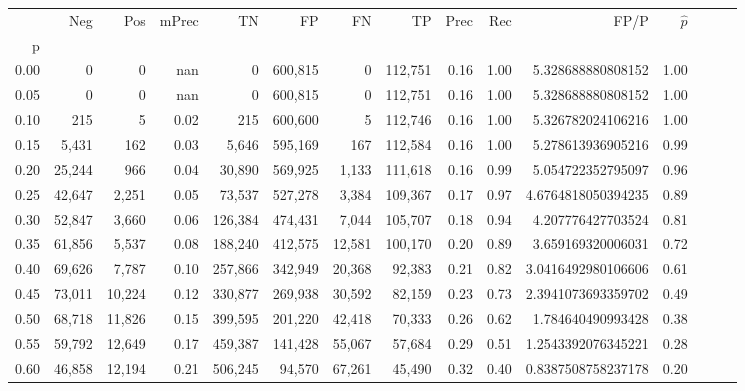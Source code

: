 \begin{tabular}{rrrrrrrrrrrrrrr}
\toprule
{} &     Neg &     Pos & mPrec &       TN &       FP &       FN &       TP &  Prec &   Rec &                    FP/P & $\hat{p}$ \\
p    &         &         &       &          &          &          &          &       &       &                         &           \\
\midrule
0.00 &       0 &       0 &   nan &        0 &  600,815 &        0 &  112,751 &  0.16 &  1.00 &       5.328688880808152 &      1.00 \\
0.05 &       0 &       0 &   nan &        0 &  600,815 &        0 &  112,751 &  0.16 &  1.00 &       5.328688880808152 &      1.00 \\
0.10 &     215 &       5 &  0.02 &      215 &  600,600 &        5 &  112,746 &  0.16 &  1.00 &       5.326782024106216 &      1.00 \\
0.15 &   5,431 &     162 &  0.03 &    5,646 &  595,169 &      167 &  112,584 &  0.16 &  1.00 &       5.278613936905216 &      0.99 \\
0.20 &  25,244 &     966 &  0.04 &   30,890 &  569,925 &    1,133 &  111,618 &  0.16 &  0.99 &       5.054722352795097 &      0.96 \\
0.25 &  42,647 &   2,251 &  0.05 &   73,537 &  527,278 &    3,384 &  109,367 &  0.17 &  0.97 &      4.6764818050394235 &      0.89 \\
0.30 &  52,847 &   3,660 &  0.06 &  126,384 &  474,431 &    7,044 &  105,707 &  0.18 &  0.94 &       4.207776427703524 &      0.81 \\
0.35 &  61,856 &   5,537 &  0.08 &  188,240 &  412,575 &   12,581 &  100,170 &  0.20 &  0.89 &       3.659169320006031 &      0.72 \\
0.40 &  69,626 &   7,787 &  0.10 &  257,866 &  342,949 &   20,368 &   92,383 &  0.21 &  0.82 &      3.0416492980106606 &      0.61 \\
0.45 &  73,011 &  10,224 &  0.12 &  330,877 &  269,938 &   30,592 &   82,159 &  0.23 &  0.73 &      2.3941073693359702 &      0.49 \\
0.50 &  68,718 &  11,826 &  0.15 &  399,595 &  201,220 &   42,418 &   70,333 &  0.26 &  0.62 &       1.784640490993428 &      0.38 \\
0.55 &  59,792 &  12,649 &  0.17 &  459,387 &  141,428 &   55,067 &   57,684 &  0.29 &  0.51 &      1.2543392076345221 &      0.28 \\
0.60 &  46,858 &  12,194 &  0.21 &  506,245 &   94,570 &   67,261 &   45,490 &  0.32 &  0.40 &      0.8387508758237178 &      0.20 \\

\end{tabular}
